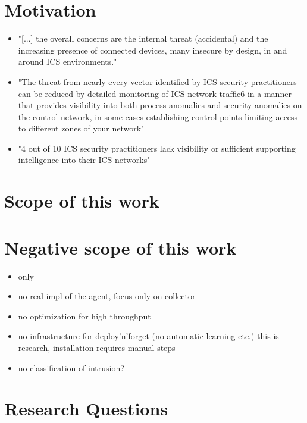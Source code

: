 \section{Motivation}
\begin{itemize}
	\item "[...] the overall concerns are the internal threat (accidental) and the increasing presence of connected devices, many insecure by design, in and around ICS environments." \parencite[p.~9]{Gregory-Brown2017}
	\item "The threat from nearly every vector identified by ICS security practitioners can be reduced by detailed monitoring of ICS network traffic6 in a manner that provides visibility into both process anomalies and security anomalies on the control network, in some cases establishing control points limiting access to different zones of your network" \parencite[p.~10]{Gregory-Brown2017}
	\item "4 out of 10 ICS security practitioners lack visibility or sufficient supporting intelligence into their ICS networks" \parencite[p.~13]{Gregory-Brown2017}
\end{itemize}

\section{Scope of this work}

\section{Negative scope of this work}
\begin{itemize}
	\item only \knx
	\item no real impl of the agent, focus only on collector
	\item no optimization for high throughput
	\item no infrastructure for deploy'n'forget (no automatic learning etc.)
		\subitem this is research, installation requires manual steps
	\item no classification of intrusion?
\end{itemize}

\section{Research Questions}

